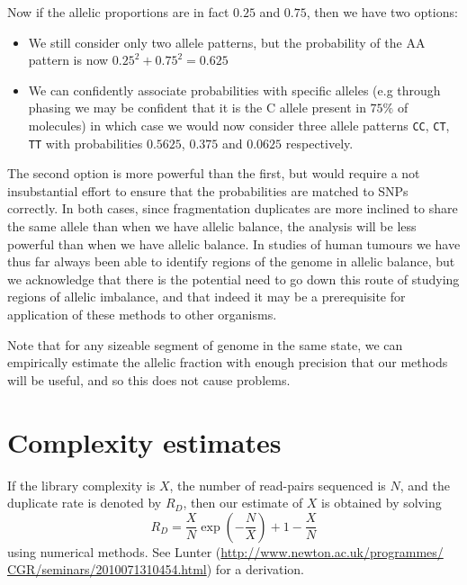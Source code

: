 \documentclass{article}
\begin{document}
Now if the allelic proportions are in fact $0.25$ and $0.75$, then we have two options:

\begin{itemize}

\item We still consider only two allele patterns, but the probability of the AA pattern is now $0.25^2 + 0.75^2 = 0.625$

\item We can confidently associate probabilities with specific alleles (e.g through phasing we may be confident that it is the C allele present in $75\%$ of molecules) in which case we would now consider three allele patterns \texttt{CC}, \texttt{CT}, \texttt{TT} with probabilities $0.5625$, $0.375$ and $0.0625$ respectively.

\end{itemize}

The second option is more powerful than the first, but would require a not insubstantial effort to ensure that the probabilities are matched to SNPs correctly. In both cases, since fragmentation duplicates are more inclined to share the same allele than when we have allelic balance, the analysis will be less powerful than when we have allelic balance. In studies of human tumours we have thus far always been able to identify regions of the genome in allelic balance, but we acknowledge that there is the potential need to go down this route of studying regions of allelic imbalance, and that indeed it may be a prerequisite for application of these methods to other organisms.

Note that for any sizeable segment of genome in the same state, we can empirically estimate the allelic fraction with enough precision that our methods will be useful, and so this does not cause problems.

\clearpage{}


\section{Complexity estimates}

If the library complexity is $X$, the number of read-pairs sequenced is $N$, and the  duplicate rate is denoted by $R_D$, then our estimate of $X$ is obtained by solving
\begin{equation}  \label{calcX}
R_D = \frac{X}{N}\exp\left(-\frac{N}{X}\right)+1-\frac{X}{N}
\end{equation}
\noindent using numerical methods. See Lunter (\url{http://www.newton.ac.uk/programmes/
CGR/seminars/2010071310454.html}) for a derivation.
\end{document}
